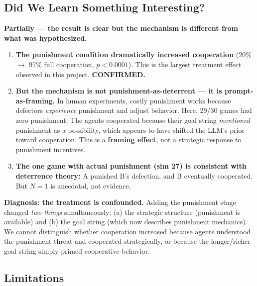 \documentclass[11pt]{article}
\begin{document}
\subsection*{Did We Learn Something Interesting?}

\textbf{Partially --- the result is clear but the mechanism is different from what was hypothesized.}

\begin{enumerate}
\item \textbf{The punishment condition dramatically increased cooperation} (20\% $\to$ 97\% full cooperation, $p < 0.0001$). This is the largest treatment effect observed in this project. \textbf{CONFIRMED.}

\item \textbf{But the mechanism is not punishment-as-deterrent --- it is prompt-as-framing.} In human experiments, costly punishment works because defectors \emph{experience} punishment and adjust behavior. Here, 29/30 games had zero punishment. The agents cooperated because their goal string \emph{mentioned} punishment as a possibility, which appears to have shifted the LLM's prior toward cooperation. This is a \textbf{framing effect}, not a strategic response to punishment incentives.

\item \textbf{The one game with actual punishment (sim 27) is consistent with deterrence theory:} A punished B's defection, and B eventually cooperated. But $N = 1$ is anecdotal, not evidence.
\end{enumerate}

\textbf{Diagnosis: the treatment is confounded.} Adding the punishment stage changed \emph{two things} simultaneously: (a) the strategic structure (punishment is available) and (b) the goal string (which now describes punishment mechanics). We cannot distinguish whether cooperation increased because agents understood the punishment threat and cooperated strategically, or because the longer/richer goal string simply primed cooperative behavior.

\subsection*{Limitations}
\end{document}
